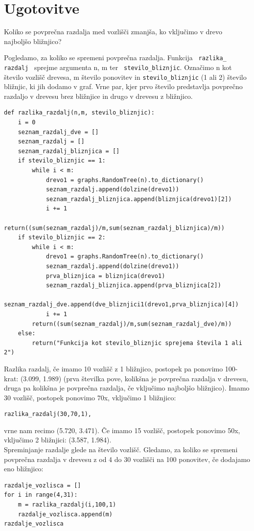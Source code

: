 \documentclass[a4paper,10pt]{article}
\begin{document}
\section{Ugotovitve}
 Koliko se povprečna razdalja med vozlišči zmanjša, ko vključimo v drevo najboljšo bližnjico?
\newline

Pogledamo, za koliko se spremeni povprečna razdalja. Funkcija \texttt{ razlika\_ razdalj } sprejme argumenta n, m ter \texttt{ stevilo\_bliznjic}. Označimo n kot število vozlišč drevesa, m število ponovitev in \texttt{stevilo\_bliznjic} (1 ali 2) število bližnjic, ki jih dodamo v graf. Vrne par, kjer prvo število predstavlja povprečno razdaljo v drevesu brez bližnjice in drugo v drevesu z bližnjico. 
\begin{verbatim}
def razlika_razdalj(n,m, stevilo_bliznjic):
    i = 0
    seznam_razdalj_dve = []
    seznam_razdalj = []
    seznam_razdalj_bliznjica = []
    if stevilo_bliznjic == 1:
        while i < m:
            drevo1 = graphs.RandomTree(n).to_dictionary()
            seznam_razdalj.append(dolzine(drevo1))
            seznam_razdalj_bliznjica.append(bliznjica(drevo1)[2])
            i += 1
        return((sum(seznam_razdalj)/m,sum(seznam_razdalj_bliznjica)/m))
    if stevilo_bliznjic == 2:
        while i < m:
            drevo1 = graphs.RandomTree(n).to_dictionary()
            seznam_razdalj.append(dolzine(drevo1))
            prva_bliznjica = bliznjica(drevo1)
            seznam_razdalj_bliznjica.append(prva_bliznjica[2])
            seznam_razdalj_dve.append(dve_bliznjici1(drevo1,prva_bliznjica)[4])
            i += 1
        return((sum(seznam_razdalj)/m,sum(seznam_razdalj_dve)/m))
    else:
        return("Funkcija kot stevilo_bliznjic sprejema števila 1 ali 2")
\end{verbatim}

Razlika razdalj, če imamo 10 vozlišč z 1 bližnjico, postopek pa ponovimo 100-krat:  (3.099, 1.989) (prva številka pove, kolikšna je povprečna razdalja v drevesu, druga pa kolikšna je povprečna razdalja, če vključimo najboljšo bližnjico).
\newline
Imamo 30 vozlišč, postopek ponovimo 70x, vključimo 1 bližnjico:
\begin{verbatim}
razlika_razdalj(30,70,1),
\end{verbatim}
vrne nam recimo (5.720, 3.471).
Če imamo 15 vozlišč, postopek ponovimo 50x, vključimo 2  bližnjici: (3.587, 1.984).
\\[0.5cm]
Spreminjanje razdalje glede na število vozlišč. Gledamo, za koliko se spremeni povprečna razdalja v drevesu z od 4 do 30 vozlišči na 100 ponovitev, če dodajamo eno bližnjico:
\begin{verbatim}
razdalje_vozlisca = []
for i in range(4,31):
    m = razlika_razdalj(i,100,1)
    razdalje_vozlisca.append(m)
razdalje_vozlisca
\end{verbatim}
\end{document}
